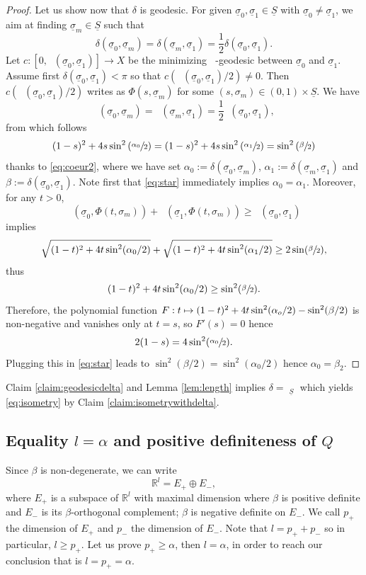 \documentclass[JEP,XML,SOM,Unicode,published]{cedram}
\newcommand\mto{\mathchoice{\longmapsto}{\mapsto}{\mapsto}{\mapsto}}
\theoremstyle{plain}
\theoremstyle{definition}
\newcommand{\setR}{\mathbb{R}}
\newcommand{\dist}{\mathsf{d}}
\newcommand{\usigma}{\underline{\sigma}}
\DeclareMathOperator{\udist}{\underline{\dist}}
\newcommand{\uS}{\underline{S}}
\begin{document}
\begin{proof}
Let us show now that $\delta$ is geodesic. For given $\usigma_0, \usigma_1 \in \uS$ with $\usigma_0 \neq \usigma_1$, we aim at finding $\usigma_m \in \uS$ such that
\[
\delta(\usigma_0,\usigma_m)=\delta(\usigma_m,\usigma_1)=\frac12\delta(\usigma_0,\usigma_1).
\]
Let $c:[0,\udist(\usigma_0,\usigma_1)]\to X$ be the minimizing $\udist$-geodesic between $\usigma_0$ and $\usigma_1$. Assume first $\delta(\usigma_0,\usigma_1)<\pi$ so that $c(\udist(\usigma_0,\usigma_1)/2)\neq 0$. Then $c(\udist(\usigma_0,\usigma_1)/2)$ writes as $\Phi(s,\usigma_m)$ for some $(s,\sigma_m) \in (0,1) \times \uS$. We have
\[
\udist(\usigma_0,\usigma_m) = \udist(\usigma_m,\usigma_1) = \frac{1}{2}\udist(\usigma_0,\usigma_1),
\]
from which follows
\begin{equation}\label{eq:star}
(1-s)^2 + 4 s \sin^2\left(\sfrac{\alpha_0}{2}\right)=(1-s)^2 + 4 s \sin^2\left(\sfrac{\alpha_1}{2}\right)= \sin^2\left(\sfrac{\beta}{2}\right)
\end{equation}
thanks to \eqref{eq:coeur2}, where we have set $\alpha_0:=\delta(\usigma_0,\usigma_m)$, $\alpha_1:=\delta(\usigma_m,\usigma_1)$ and $\beta:=\delta(\usigma_0,\usigma_1)$.
Note first that \eqref{eq:star} immediately implies $\alpha_0=\alpha_1$. Moreover, for any $t>0$,
\[
\udist\left(\usigma_0,\Phi(t,\sigma_m)\right)+\udist\left(\usigma_1,\Phi(t,\sigma_m)\right)\ge \udist\left(\usigma_0,\usigma_1\right)
\]
implies
\[
\sqrt{(1-t)^2 + 4t \sin^2(\alpha_0/2)} + \sqrt{(1-t)^2 + 4t \sin^2(\alpha_1/2)} \ge 2 \sin(\sfrac{\beta}{2}),
\]
thus
\[
(1-t)^2 + 4t \sin^2(\alpha_0/2) \ge \sin^2(\sfrac{\beta}{2}).
\]
Therefore, the polynomial function $F: t \mto (1-t)^2 + 4t\sin^2(\alpha_o/2) - \sin^2(\beta/2)$
is non-negative and vanishes only at $t=s$, so $F'(s)=0$ hence
\[
2(1-s) = 4 \sin^2(\sfrac{\alpha_0}{2}).
\]
Plugging this in \eqref{eq:star} leads to $\sin^2(\beta/2) = \sin^2(\alpha_0/2)$
hence $\alpha_0=\beta_2$.
\end{proof}

Claim \ref{claim:geodesicdelta} and Lemma \ref{lem:length} implies $\delta=\udist_{\uS}$ which yields \eqref{eq:isometry} by Claim \ref{claim:isometrywithdelta}.

\subsection{Equality $l=\alpha$ and positive definiteness of $Q$}\label{subsec:4.3}

Since $\beta$ is non-degenerate, we can write
\begin{equation}\label{eq:decomposition}
\setR^l = E_+\oplus E_-,
\end{equation}
where $E_+$ is a subspace of $\setR^l$ with maximal dimension where $\beta$ is positive definite and $E_-$ is its $\beta$-orthogonal complement; $\beta$ is negative definite on $E_-$. We call $p_+$ the dimension of $E_+$ and $p_-$ the dimension of $E_-$. Note that $l = p_+ + p_-$ so in particular, $l \ge p_+$. Let us prove $p_+ \ge \alpha$, then $l = \alpha$, in order to reach our conclusion that is $l=p_+=\alpha$.
\end{document}
